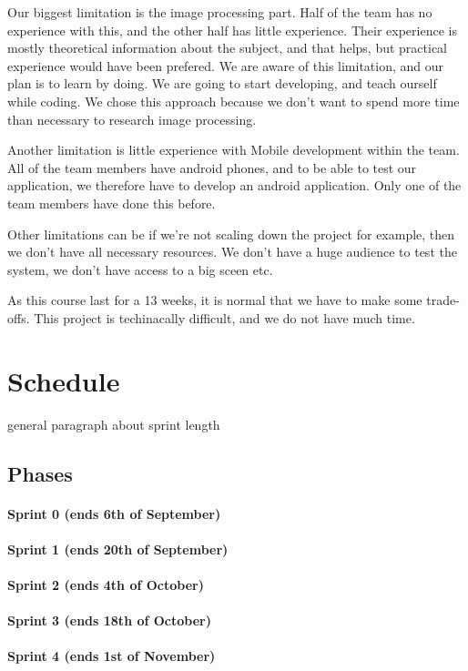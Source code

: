 \documentclass{article}
\begin{document}
Our biggest limitation is the image processing part. Half of the team has no experience with this, and the other half has little experience. Their experience is mostly theoretical information about the subject, and that helps, but practical experience would have been prefered. We are aware of this limitation, and our plan is to learn by doing. We are going to start developing, and teach ourself while coding. We chose this approach because we don't want to spend more time than necessary to research image processing.   

Another limitation is little experience with Mobile development within the team. All of the team members have android phones, and to be able to test our application, we therefore have to develop an android application. Only one of the team members have done this before. 

Other limitations can be if we're not scaling down the project for example, then we don't have all necessary resources. We don't have a huge audience to test the system, we don't have access to a big sceen etc.   

As this course last for a 13 weeks, it is normal that we have to make some trade-offs.
This project is techinacally difficult, and we do not have much time.  
  
\section{Schedule}
general paragraph about sprint length
\subsection{Phases}
\paragraph{Sprint 0 (ends 6th of September)}
\paragraph{Sprint 1 (ends 20th of September)}
\paragraph{Sprint 2 (ends 4th of October)}
\paragraph{Sprint 3 (ends 18th of October)}
\paragraph{Sprint 4 (ends 1st of November)}
\end{document}
